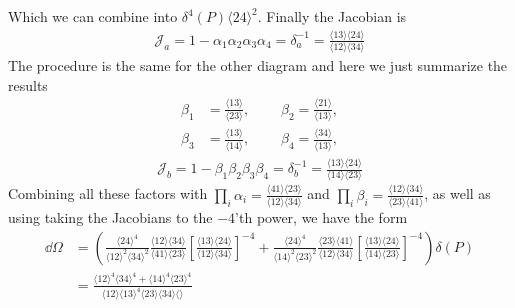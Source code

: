 \documentclass[letter,11pt]{article}
\newcommand{\ab}[1]{\langle #1 \rangle}
\begin{document}
Which we can combine into $\delta^4(P)\ab{24}^2$. Finally the Jacobian is
\begin{equation}
	\begin{aligned}
		\mathcal{J}_a=1-\alpha_{1}\alpha_{2}\alpha_{3}\alpha_{4}=\delta_a^{-1}=
		\frac{ \langle 13 \rangle\langle 24 \rangle}{\langle 1 2 \rangle \langle 34 \rangle}
	\end{aligned}
\end{equation}
The procedure is the same for the other diagram and here we just summarize the results
\begin{equation}
	\begin{aligned}
		\beta_1&=\frac{\langle 13 \rangle}{\langle 23\rangle},~~~~~~~~~~\beta_2=\frac{\langle 21 \rangle}{\langle 13\rangle},\\
		\beta_3&=\frac{\langle 13 \rangle}{\langle 14\rangle},~~~~~~~~~~	\beta_4=\frac{\langle 34 \rangle}{\langle 13\rangle},
	\end{aligned}
\end{equation}
\begin{equation}
	\begin{aligned}
		\mathcal{J}_b=1-\beta_{1}\beta_{2}\beta_{3}\beta_{4}=\delta_b^{-1}=
		\frac{ \langle 13 \rangle\langle 24 \rangle}{\langle 1 4 \rangle \langle 23 \rangle}
	\end{aligned}
\end{equation}
Combining all these factors with $\prod_i \alpha_i=\frac{\ab{41}\ab{23}}{\ab{12}\ab{34}}$ and $\prod_i \beta_i=\frac{\ab{12}\ab{34}}{\ab{23}\ab{41}}$, as well as using taking the Jacobians to the $-4$'th power, we have the form
\begin{equation}
	\begin{aligned}
		\dd \Omega &= \left(\frac{\ab{24}^4}{\ab{12}^2\ab{34}^2}\frac{ \ab{12}\ab{34}}{\ab{41}\ab{23} } \left[\frac{ \langle 13 \rangle\langle 24 \rangle}{\langle 1 2 \rangle \langle 34 \rangle}\right]^{-4}+\frac{\ab{24}^4}{\ab{14}^2\ab{23}^2}\frac{\ab{23}\ab{41}}{\ab{12}\ab{34}}\left[	\frac{ \langle 13 \rangle\langle 24 \rangle}{\langle 1 4 \rangle \langle 23 \rangle}\right]^{-4}\right)\delta(P)\\
		&=\frac{\ab{12}^4\ab{34}^4+\ab{14}^4\ab{23}^4}{\ab{12}\ab{13}^4\ab{23}\ab{34}\ab{}}
	\end{aligned}
\end{equation}
\end{document}
